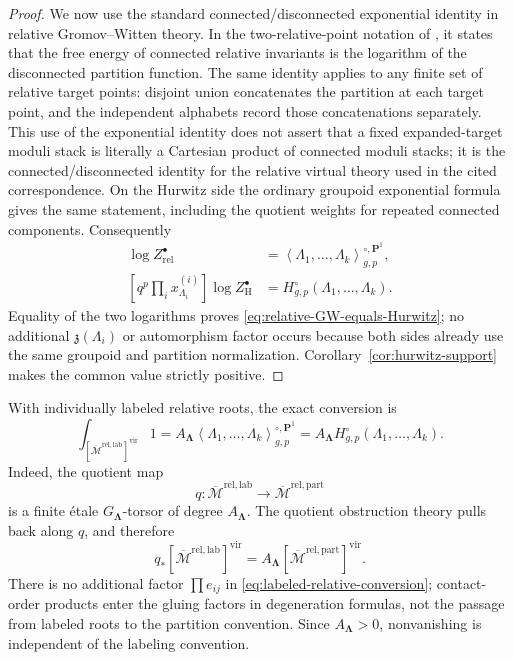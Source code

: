 \documentclass[11pt]{amsart}
\theoremstyle{plain}
\theoremstyle{definition}
\numberwithin{equation}{section}
\begin{document}
\begin{proof}
We now use the standard connected/disconnected exponential identity in
relative Gromov--Witten theory.  In the two-relative-point notation of
\cite[equations~(4.1)--(4.2)]{OkounkovPandharipande}, it states that the
free energy of connected relative invariants is the logarithm of the
disconnected partition function.  The same identity applies to any finite
set of relative target points: disjoint union concatenates the partition
at each target point, and the independent alphabets record those
concatenations separately.  This use of the exponential identity does not
assert that a fixed expanded-target moduli stack is literally a Cartesian
product of connected moduli stacks; it is the connected/disconnected
identity for the relative virtual theory used in the cited correspondence.
On the Hurwitz side the ordinary groupoid exponential formula gives the
same statement, including the quotient weights for repeated connected
components.  Consequently
\begin{align*}
 [q^p\prod_i x^{(i)}_{\Lambda_i}]
 \log Z^\bullet_{\mathrm{rel}}
 &=\left\langle\Lambda_1,\ldots,\Lambda_k
   \right\rangle^{\circ,\mathbf P^1}_{g,p},\\
 [q^p\prod_i x^{(i)}_{\Lambda_i}]
 \log Z^\bullet_{\mathrm H}
 &=H^\circ_{g,p}(\Lambda_1,\ldots,\Lambda_k).
\end{align*}
Equality of the two logarithms proves
\eqref{eq:relative-GW-equals-Hurwitz}; no additional
$\mathfrak z(\Lambda_i)$ or automorphism factor occurs because both sides
already use the same groupoid and partition normalization.
Corollary~\ref{cor:hurwitz-support} makes the common value strictly
positive.
\end{proof}

With individually labeled relative roots, the exact conversion is
\begin{equation}\label{eq:labeled-relative-conversion}
 \int_{[\overline{\mathcal M}^{\mathrm{rel,lab}}]^{\mathrm{vir}}}1
 =A_{\boldsymbol\Lambda}
  \left\langle\Lambda_1,\ldots,\Lambda_k
  \right\rangle^{\circ,\mathbf P^1}_{g,p}
 =A_{\boldsymbol\Lambda}
  H^\circ_{g,p}(\Lambda_1,\ldots,\Lambda_k).
\end{equation}
Indeed, the quotient map
\[
 q:\overline{\mathcal M}^{\mathrm{rel,lab}}
 \longrightarrow\overline{\mathcal M}^{\mathrm{rel,part}}
\]
is a finite \'etale $G_{\boldsymbol\Lambda}$-torsor of degree
$A_{\boldsymbol\Lambda}$.  The quotient obstruction theory pulls back
along $q$, and therefore
\[
 q_*[\overline{\mathcal M}^{\mathrm{rel,lab}}]^{\mathrm{vir}}
 =A_{\boldsymbol\Lambda}
 [\overline{\mathcal M}^{\mathrm{rel,part}}]^{\mathrm{vir}}.
\]
There is no additional factor $\prod e_{ij}$ in
\eqref{eq:labeled-relative-conversion}; contact-order products enter the
gluing factors in degeneration formulas, not the passage from labeled
roots to the partition convention.  Since
$A_{\boldsymbol\Lambda}>0$, nonvanishing is independent of the labeling
convention.
\end{document}
